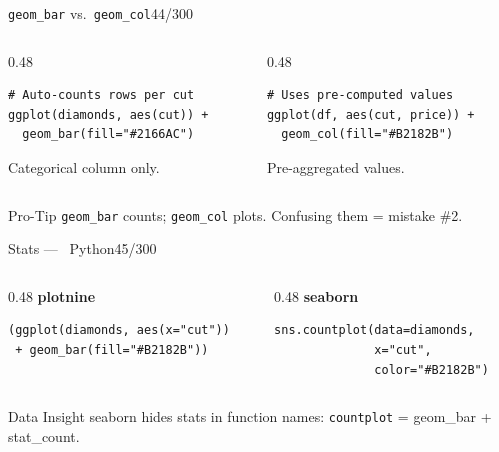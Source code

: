 \documentclass[10pt]{beamer}
\newcommand{\Python}{\textcolor{PyAccent}{\faPython~Python}}
\newcommand{\smark}[1]{\hfill{\scriptsize\color{codegray}#1}}
\begin{document}
\begin{frame}[fragile]{\texttt{geom\_bar} vs.\ \texttt{geom\_col}}\smark{44/300}
\begin{columns}[T]
\begin{column}{0.48\textwidth}
\begin{lstlisting}[style=Rstyle]
# Auto-counts rows per cut
ggplot(diamonds, aes(cut)) +
  geom_bar(fill="#2166AC")
\end{lstlisting}
\scriptsize Categorical column only.
\end{column}
\begin{column}{0.48\textwidth}
\begin{lstlisting}[style=Rstyle]
# Uses pre-computed values
ggplot(df, aes(cut, price)) +
  geom_col(fill="#B2182B")
\end{lstlisting}
\scriptsize Pre-aggregated values.
\end{column}
\end{columns}
\vspace{0.2cm}
\begin{alertblock}{Pro-Tip}
    \scriptsize \texttt{geom\_bar} counts; \texttt{geom\_col} plots. Confusing them = mistake \#2.
\end{alertblock}
\end{frame}

\begin{frame}[fragile]{Stats --- \Python}\smark{45/300}
\begin{columns}[T]
\begin{column}{0.48\textwidth}
\centering\textbf{plotnine}\\[0.1cm]
\begin{lstlisting}[style=Pystyle]
(ggplot(diamonds, aes(x="cut"))
 + geom_bar(fill="#B2182B"))
\end{lstlisting}
\end{column}
\begin{column}{0.48\textwidth}
\centering\textbf{seaborn}\\[0.1cm]
\begin{lstlisting}[style=Pystyle]
sns.countplot(data=diamonds,
              x="cut",
              color="#B2182B")
\end{lstlisting}
\end{column}
\end{columns}
\vspace{0.2cm}
\begin{exampleblock}{Data Insight}
    \scriptsize seaborn hides stats in function names: \texttt{countplot} = geom\_bar + stat\_count.
\end{exampleblock}
\end{frame}
\end{document}
